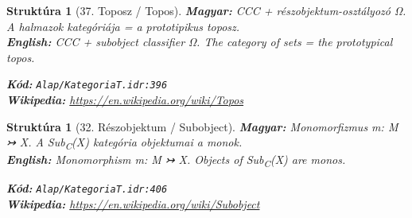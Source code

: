\documentclass[11pt,a4paper,twocolumn]{article}
\newtheorem{struktura}[tetel]{Struktúra}
\begin{document}
\begin{struktura}[37. Toposz / Topos]

\textbf{Magyar:} CCC + részobjektum-osztályozó Ω. A halmazok kategóriája = a prototipikus toposz.\\

\textbf{English:} CCC + subobject classifier Ω. The category of sets = the prototypical topos.\\

\begin{center}
\end{center}

\textbf{Kód:} \texttt{Alap/KategoriaT.idr:396}\\
\textbf{Wikipedia:} \url{https://en.wikipedia.org/wiki/Topos}

\end{struktura}

\vspace{0.5cm}

\begin{struktura}[32. Részobjektum / Subobject]

\textbf{Magyar:} Monomorfizmus m: M ↣ X. A Sub\textsubscript{C}(X) kategória objektumai a monok.\\

\textbf{English:} Monomorphism m: M ↣ X. Objects of Sub\textsubscript{C}(X) are monos.\\

\begin{center}
\end{center}

\textbf{Kód:} \texttt{Alap/KategoriaT.idr:406}\\
\textbf{Wikipedia:} \url{https://en.wikipedia.org/wiki/Subobject}

\end{struktura}

\vspace{0.5cm}
\end{document}
